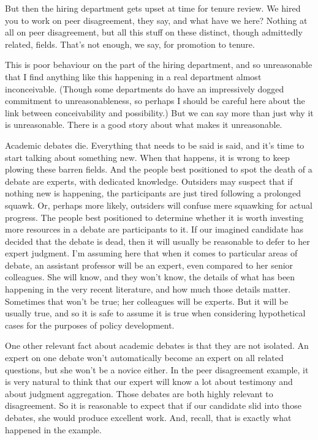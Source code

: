 But then the hiring department gets upset at time for tenure review. We hired you to work on peer disagreement, they say, and what have we here? Nothing at all on peer disagreement, but all this stuff on these distinct, though admittedly related, fields. That's not enough, we say, for promotion to tenure.

This is poor behaviour on the part of the hiring department, and so unreasonable that I find anything like this happening in a real department almost inconceivable. (Though some departments do have an impressively dogged commitment to unreasonableness, so perhaps I should be careful here about the link between conceivability and possibility.) But we can say more than just why it is unreasonable. There is a good story about what makes it unreasonable.

Academic debates die. Everything that needs to be said is said, and it's time to start talking about something new. When that happens, it is wrong to keep plowing these barren fields. And the people best positioned to spot the death of a debate are experts, with dedicated knowledge. Outsiders may suspect that if nothing new is happening, the participants are just tired following a prolonged squawk. Or, perhaps more likely, outsiders will confuse mere squawking for actual progress. The people best positioned to determine whether it is worth investing more resources in a debate are participants to it. If our imagined candidate has decided that the debate is dead, then it will usually be reasonable to defer to her expert judgment. I'm assuming here that when it comes to particular areas of debate, an assistant professor will be an expert, even compared to her senior colleagues. She will know, and they won't know, the details of what has been happening in the very recent literature, and how much those details matter. Sometimes that won't be true; her colleagues will be experts. But it will be usually true, and so it is safe to assume it is true when considering hypothetical cases for the purposes of policy development. 

One other relevant fact about academic debates is that they are not isolated. An expert on one debate won't automatically become an expert on all related questions, but she won't be a novice either. In the peer disagreement example, it is very natural to think that our expert will know a lot about testimony and about judgment aggregation. Those debates are both highly relevant to disagreement. So it is reasonable to expect that if our candidate slid into those debates, she would produce excellent work. And, recall, that is exactly what happened in the example.

